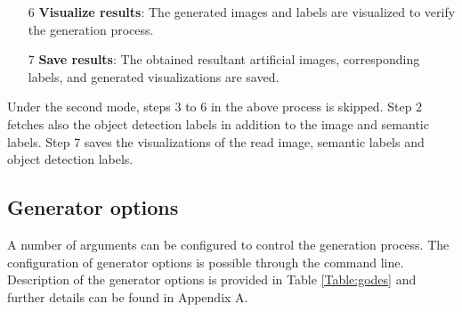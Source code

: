\begin{itemize}
		\item[6] \textbf{Visualize results}: The generated images and labels are visualized to verify the generation process.
		\item[7] \textbf{Save results}: The obtained resultant artificial images, corresponding labels, and generated visualizations are saved.
	\end{itemize}
	
Under the second mode, steps 3 to 6 in the above process is skipped. Step 2 fetches also the object detection labels in addition to the image and semantic labels. Step 7 saves the visualizations of the read image, semantic labels and object detection labels.
		

\subsection{Generator options}

A number of arguments can be configured to control the generation process. The configuration of generator options is possible through the command line. Description of the generator options is provided in Table \ref{Table:godes} and further details can be found in Appendix A.

